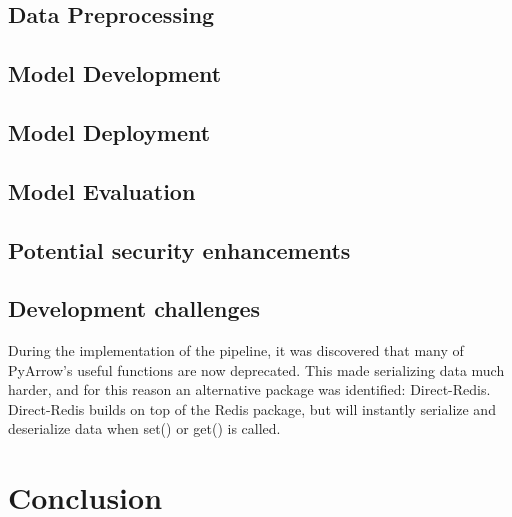 \documentclass[12pt]{report}
\begin{document}



\section{Data Preprocessing}\label{sec:ImpPreprocessing}

\section{Model Development}\label{sec:ImpDevelopment}

\section{Model Deployment}\label{sec:ImpDeployment}

\section{Model Evaluation}\label{sec:ImpEvaluation}

\section{Potential security enhancements}\label{sec:SecurityEnhancements}

\section{Development challenges}
During the implementation of the pipeline, it was discovered that many of PyArrow's useful functions are now 
deprecated. This made serializing data much harder, and for this reason an alternative package was identified:
Direct-Redis. Direct-Redis builds on top of the Redis package, but will instantly serialize and deserialize data 
when set() or get() is called.

\chapter*{Conclusion}




\printbibliography
\end{document}
